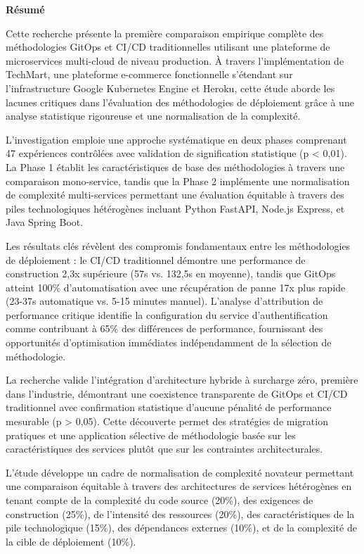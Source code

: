 \thispagestyle{empty}

\begin{center}
{\Large \textbf{Résumé}}
\end{center}

\vspace{1cm}

Cette recherche présente la première comparaison empirique complète des méthodologies GitOps et CI/CD traditionnelles utilisant une plateforme de microservices multi-cloud de niveau production. À travers l'implémentation de TechMart, une plateforme e-commerce fonctionnelle s'étendant sur l'infrastructure Google Kubernetes Engine et Heroku, cette étude aborde les lacunes critiques dans l'évaluation des méthodologies de déploiement grâce à une analyse statistique rigoureuse et une normalisation de la complexité.

L'investigation emploie une approche systématique en deux phases comprenant 47 expériences contrôlées avec validation de signification statistique (p < 0,01). La Phase 1 établit les caractéristiques de base des méthodologies à travers une comparaison mono-service, tandis que la Phase 2 implémente une normalisation de complexité multi-services permettant une évaluation équitable à travers des piles technologiques hétérogènes incluant Python FastAPI, Node.js Express, et Java Spring Boot.

Les résultats clés révèlent des compromis fondamentaux entre les méthodologies de déploiement : le CI/CD traditionnel démontre une performance de construction 2,3x supérieure (57s vs. 132,5s en moyenne), tandis que GitOps atteint 100\% d'automatisation avec une récupération de panne 17x plus rapide (23-37s automatique vs. 5-15 minutes manuel). L'analyse d'attribution de performance critique identifie la configuration du service d'authentification comme contribuant à 65\% des différences de performance, fournissant des opportunités d'optimisation immédiates indépendamment de la sélection de méthodologie.

La recherche valide l'intégration d'architecture hybride à surcharge zéro, première dans l'industrie, démontrant une coexistence transparente de GitOps et CI/CD traditionnel avec confirmation statistique d'aucune pénalité de performance mesurable (p > 0,05). Cette découverte permet des stratégies de migration pratiques et une application sélective de méthodologie basée sur les caractéristiques des services plutôt que sur les contraintes architecturales.

L'étude développe un cadre de normalisation de complexité novateur permettant une comparaison équitable à travers des architectures de services hétérogènes en tenant compte de la complexité du code source (20\%), des exigences de construction (25\%), de l'intensité des ressources (20\%), des caractéristiques de la pile technologique (15\%), des dépendances externes (10\%), et de la complexité de la cible de déploiement (10\%).


